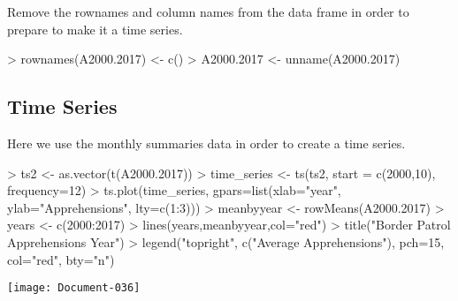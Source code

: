 \documentclass[letterpaper]{article}
\begin{document}
Remove the rownames and column names from the data frame in order to prepare to make it a time series.
\begin{Schunk}
\begin{Sinput}
> rownames(A2000.2017) <- c()
> A2000.2017 <- unname(A2000.2017)
\end{Sinput}
\end{Schunk}

\subsection{Time Series}

Here we use the monthly summaries data in order to create a time series.
\begin{Schunk}
\begin{Sinput}
> ts2 <- as.vector(t(A2000.2017))
> time_series <- ts(ts2, start = c(2000,10), frequency=12)
> ts.plot(time_series, gpars=list(xlab="year", ylab="Apprehensions", lty=c(1:3)))
> meanbyyear <- rowMeans(A2000.2017)
> years <- c(2000:2017)
> lines(years,meanbyyear,col="red")
> title("Border Patrol Apprehensions Year")
> legend("topright", c("Average Apprehensions"), pch=15,  col="red",  bty="n")
\end{Sinput}
\end{Schunk}
\texttt{[image: Document-036]}
\end{document}
